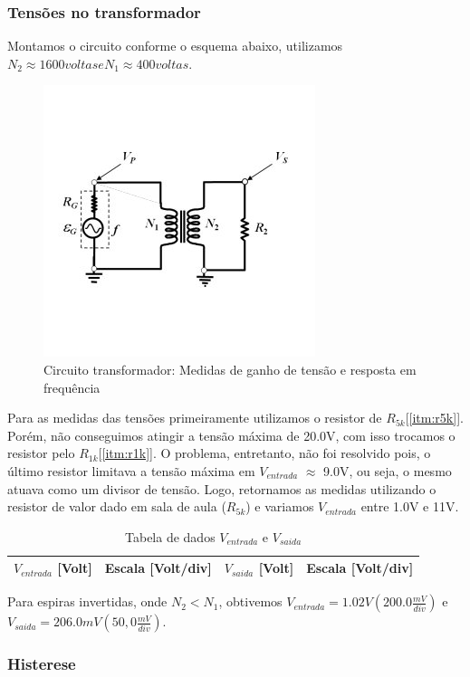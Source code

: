 \documentclass[12pt,letterpaper]{article}
\begin{document}
\subsubsection{Tensões no transformador} \label{itm:ttrans} 
Montamos o circuito conforme o esquema abaixo, utilizamos $N_{2} \approx 1600 voltas e N_{1} \approx 400 voltas$.\\
\begin{figure}[!htb]
  \centering
  \label{itransf}
  \includegraphics[scale=0.7]{img/transf.jpg}
  \caption{Circuito transformador: Medidas de ganho de tensão e resposta em frequência}
\end{figure}
Para as medidas das tensões primeiramente utilizamos o resistor de $R_{5k}$[\ref{itm:r5k}]. Porém, não conseguimos atingir a tensão máxima de 20.0V, com isso trocamos o resistor pelo $R_{1k}$[\ref{itm:r1k}]. O problema, entretanto, não foi resolvido pois, o último resistor limitava a tensão máxima em $V_{entrada}$ $\approx$ 9.0V, ou seja, o mesmo atuava como um divisor de tensão. Logo, retornamos as medidas utilizando o resistor de valor dado em sala de aula ($R_{5k}$) e variamos $V_{entrada}$ entre 1.0V e 11V. 
\begin{table}
  \tiny
  \centering
  \begin{tabular}{|c|c|c|c|}
    \hline
    $V_{entrada}$ [Volt] & Escala [Volt/div] & $V_{saida}$ [Volt] & Escala [Volt/div]\\
    \hline
        
    \hline
  \end{tabular}
  \caption{Tabela de dados $V_{entrada}$ e $V_{saida}$}
\end{table}
Para espiras invertidas, onde $N_{2} < N_{1}$, obtivemos $V_{entrada} = 1.02V (200.0\frac{mV}{div})$ e $V_{saida} = 206.0mV (50,0\frac{mV}{div})$.\\
\subsubsection{Histerese}
\end{document}
